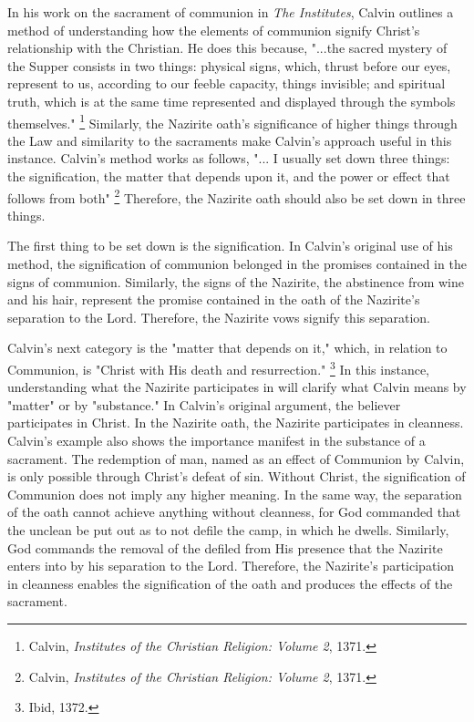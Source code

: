 \documentclass[12pt]{turabian-researchpaper}
\begin{document}
\par
In his work on the sacrament of communion in \textit{The Institutes}, Calvin outlines a method of understanding how the elements of communion signify Christ's relationship with the Christian. 
He does this because, "...the sacred mystery of the Supper consists in two things: physical signs, which, thrust before our eyes, represent to us, according to our feeble capacity, things invisible; and spiritual truth, which is at the same time represented and displayed through the symbols themselves." \footnote{Calvin, \textit{Institutes of the Christian Religion: Volume 2}, 1371.} 
Similarly, the Nazirite oath's significance of higher things through the Law and similarity to the sacraments make Calvin's approach useful in this instance.
Calvin's method works as follows, "... I usually set down three things: the signification, the matter that depends upon it, and the power or effect that follows from both" \footnote{Calvin, \textit{Institutes of the Christian Religion: Volume 2}, 1371.} 
Therefore, the Nazirite oath should also be set down in three things.

\par
The first thing to be set down is the signification.
In Calvin's original use of his method, the signification of communion belonged in the promises contained in the signs of communion. 
Similarly, the signs of the Nazirite, the abstinence from wine and his hair, represent the promise contained in the oath of the Nazirite's separation to the Lord.
Therefore, the Nazirite vows signify this separation.


\par
Calvin's next category is the "matter that depends on it," which, in relation to Communion, is "Christ with His death and resurrection." \footnote{Ibid, 1372.} 
In this instance, understanding what the Nazirite participates in will clarify what Calvin means by "matter" or by "substance." 
In Calvin's original argument, the believer participates in Christ.
In the Nazirite oath, the Nazirite participates in cleanness.
Calvin's example also shows the importance manifest in the substance of a sacrament.
The redemption of man, named as an effect of Communion by Calvin, is only possible through Christ's defeat of sin.
Without Christ, the signification of Communion does not imply any higher meaning. 
In the same way, the separation of the oath cannot achieve anything without cleanness, for God commanded that the unclean be put out as to not defile the camp, in which he dwells. 
Similarly, God commands the removal of the defiled from His presence that the Nazirite enters into by his separation to the Lord.
Therefore, the Nazirite's participation in cleanness enables the signification of the oath and produces the effects of the sacrament.
\end{document}
